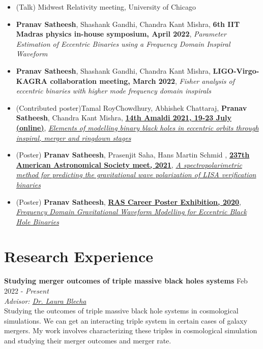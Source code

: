 \documentclass[margin, centered]{res}
\begin{document}
\begin{resume}
\begin{itemize}[leftmargin=*]
    \item (Talk) Midwest Relativity meeting, University of Chicago
    \item \textbf{Pranav Satheesh}, Shashank Gandhi, Chandra Kant Mishra, {\color{C1} \textbf{6th IIT Madras physics in-house symposium, April 2022}}, {\color{C2} \emph{Parameter Estimation of Eccentric Binaries using a Frequency Domain Inspiral Waveform}}\\
    \item \textbf{Pranav Satheesh}, Shashank Gandhi, Chandra Kant Mishra, {\color{C1} \textbf{LIGO-Virgo-KAGRA collaboration meeting, March 2022}}, {\color{C2} \emph{Fisher analysis of eccentric binaries with higher mode frequency domain inspirals}}\\
    \item (Contributed poster)Tamal RoyChowdhury, Abhishek Chattaraj, \textbf{Pranav Satheesh}, Chandra Kant Mishra, \href{https://www.amaldi14.org/}{\textbf{14th Amaldi 2021, 19-23 July (online)}}, \href{https://drive.google.com/file/d/1tCGgniOafmLfrbhD4X7ca3VkhOJtOSc2/view?usp=sharing}{\color{C2} \textit{Elements of modelling binary black holes in eccentric orbits through inspiral, merger and ringdown stages}}
    \item (Poster) \textbf{Pranav Satheesh}, Prasenjit Saha, Hans Martin Schmid , \href{https://aas.org/meetings/aas237}{\textbf{237th American Astronomical Society meet, 2021}}, \href{aas237-aas.ipostersessions.com/Default.aspx?s=79-64-0C-43-B0-53-8B-48-C7-A1-41-CE-DF-A9-70-2A}{\color{C2}\textit{A spectropolarimetric method for predicting the gravitational wave polarization of LISA verification binaries}}
    \item  (Poster) \textbf{Pranav Satheesh}, \href{https://ras.ac.uk/ras-2020-posters}{\textbf{RAS Career Poster Exhibition, 2020}}, \href{https://ras.ac.uk/poster-contest/pranav-satheesh}{\color{C2} {\textit{Frequency Domain Gravitational Waveform Modelling for Eccentric Black Hole Binaries}}}\\ 
\end{itemize}   

\section{Research Experience}

\textbf{Studying merger outcomes of triple massive black holes systems } \hfill Feb 2022 - \emph{Present}\\
\emph{Advisor: \href{http://www.phys.ufl.edu/~lblecha/}{Dr. Laura Blecha}}
\vspace{0.1 cm}\\
Studying the outcomes of triple massive black hole systems in cosmological simulations. We can get an interacting triple system in certain cases of galaxy mergers. My work involves characterizing these triples in cosmological simulation and studying their merger outcomes and merger rate.  


\end{resume}
\end{document}
